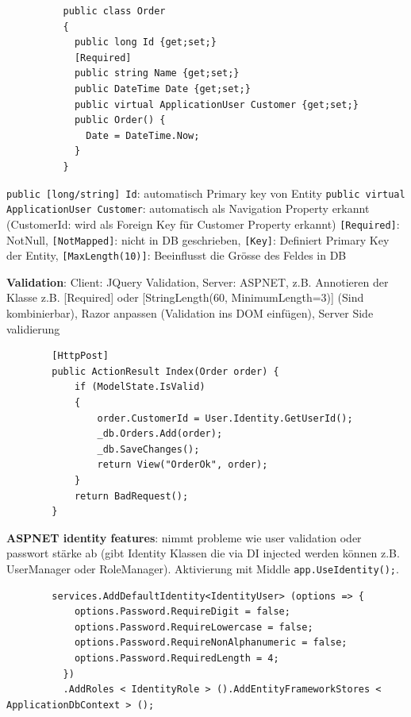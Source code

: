 \documentclass[10pt,landscape]{article}
\begin{document}
\begin{multicols}{2}
        \begin{lstlisting}
          public class Order
          {
            public long Id {get;set;}
            [Required]
            public string Name {get;set;}
            public DateTime Date {get;set;}
            public virtual ApplicationUser Customer {get;set;}
            public Order() {
              Date = DateTime.Now;
            }
          }
        \end{lstlisting}

        \lstinline{public [long/string] Id}: automatisch Primary key von Entity
        \lstinline{public virtual ApplicationUser Customer}: automatisch als Navigation Property erkannt (CustomerId: wird als Foreign Key für Customer Property erkannt)
        \lstinline{[Required]}: NotNull, \lstinline{[NotMapped]}: nicht in DB geschrieben, \lstinline{[Key]}: Definiert Primary Key der Entity, \lstinline{[MaxLength(10)]}: Beeinflusst die Grösse des Feldes in DB

        \textbf{Validation}: Client: JQuery Validation, Server: ASPNET, z.B. Annotieren der Klasse z.B. [Required] oder [StringLength(60, MinimumLength=3)] (Sind kombinierbar), Razor anpassen (Validation ins DOM einfügen), Server Side validierung

        \begin{lstlisting}
        [HttpPost]
        public ActionResult Index(Order order) {
            if (ModelState.IsValid)
            {
                order.CustomerId = User.Identity.GetUserId();
                _db.Orders.Add(order);
                _db.SaveChanges();
                return View("OrderOk", order);
            }
            return BadRequest();
        }
        \end{lstlisting}

        \textbf{ASPNET identity features}: nimmt probleme wie user validation oder passwort stärke ab (gibt Identity Klassen die via DI injected werden können z.B. UserManager oder RoleManager).
        Aktivierung mit Middle \lstinline{app.UseIdentity();}.

        \begin{lstlisting}
        services.AddDefaultIdentity<IdentityUser> (options => {
            options.Password.RequireDigit = false;
            options.Password.RequireLowercase = false;
            options.Password.RequireNonAlphanumeric = false;
            options.Password.RequiredLength = 4;
          })
          .AddRoles < IdentityRole > ().AddEntityFrameworkStores < ApplicationDbContext > ();
        \end{lstlisting}


\end{multicols}
\end{document}
